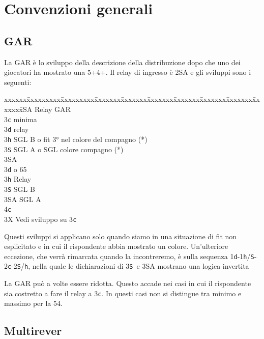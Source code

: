 \documentclass[a4paper,italian]{article}
\newcommand{\BS}{\small{\texttt{S}}}
\newcommand{\BC}{\small{\texttt{c}}}
\newcommand{\BD}{\small{\texttt{d}}}
\newcommand{\BH}{\small{\texttt{h}}}
\newenvironment{bidtable}
{\begin{tabbing}

    xxxxxx\=xxxxxxxxx\=xxxxxxxxx\=xxxxxxx\=xxxxxxx\=xxxxxxx\=xxxxxxx\=xxxxxxx\=xxxxxxx\=xxxxxxx\=\kill}
{\end{tabbing} }%
\newenvironment{attenzione}[1]
{\begin{tcolorbox}[colframe=red!80!white,title=#1]}
    {
\end{tcolorbox} }%
\begin{document}
\newpage
\setcounter{page}{1}

\section{Convenzioni generali}

\subsection{GAR}\label{GAR}

La GAR è lo sviluppo della descrizione della distribuzione dopo che uno dei giocatori ha mostrato una 5+4+. Il relay di ingresso è 2\small{SA} e gli sviluppi sono i seguenti:
\bigbreak

\begin{bidtable}
    2\small{SA} \> Relay GAR\+\\
    3\BC {} minima\+\\
    3\BD \> relay\+\\
    3\BH \> SGL B o fit 3° nel colore del compagno (*)\\
    3\BS \> SGL A o SGL colore compagno (*)\\
    3\small{SA} \-\-\\
    3\BD {} o 65\+\\
    3\BH \> Relay\+\\
    3\BS \> SGL B\\
    3\small{SA} \> SGL A\\
    4\BC {}\-\-\\
    3X \> Vedi sviluppo su 3\BC \-
\end{bidtable}
\bigbreak
\begin{attenzione}{ATTENZIONE(*)}
    Questi sviluppi si applicano solo quando siamo in una situazione di fit non esplicitato e in cui il rispondente abbia mostrato un colore. Un'ulteriore eccezione, che verrà rimarcata quando la incontreremo, è sulla sequenza 1\BD -1\BH/\BS-2\BC -2\BS/\BH, nella quale le dichiarazioni di 3\BS\ e 3\small{SA} mostrano una logica invertita
\end{attenzione}
\bigbreak
La GAR può a volte essere ridotta. Questo accade nei casi in cui il rispondente sia costretto a fare il relay a 3\BC . In questi casi non si distingue tra minimo e massimo per la 54.
\bigbreak

\subsection{Multirever}\label{multirever}
\end{document}
